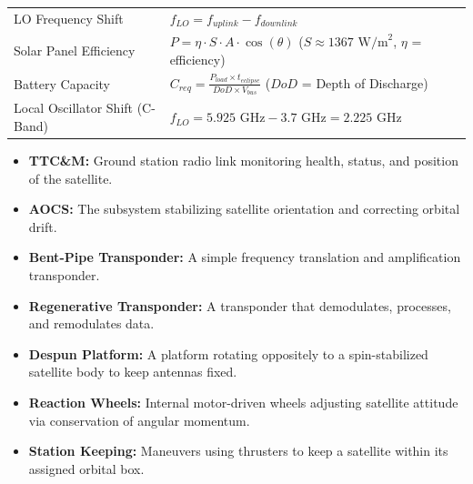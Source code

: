 \documentclass[12pt,a4paper]{article}
\renewcommand{\arraystretch}{1.45}
\begin{document}
\begin{tcolorbox}[formulabox, title={\textbf{Key Formulas at a Glance}}]
\renewcommand{\arraystretch}{1.3}
\begin{tabularx}{\linewidth}{B{5.0cm} X}LO Frequency Shift & $f_{LO} = f_{uplink} - f_{downlink}$ \\[4pt]
Solar Panel Efficiency & $P = \eta \cdot S \cdot A \cdot \cos(\theta)$ \quad ($S \approx 1367 \text{ W/m}^2$, $\eta$ = efficiency) \\[4pt]
Battery Capacity & $C_{req} = \frac{P_{load} \times t_{eclipse}}{DoD \times V_{bus}}$ \quad ($DoD$ = Depth of Discharge) \\[4pt]
Local Oscillator Shift (C-Band) & $f_{LO} = 5.925\text{ GHz} - 3.7\text{ GHz} = 2.225\text{ GHz}$
\end{tabularx}
\end{tcolorbox}

\begin{tcolorbox}[defbox, title={\textbf{One-Line Definitions}}]
\begin{itemize}[leftmargin=*, itemsep=2.5pt, topsep=0pt]
  \item \textbf{TTC\&M:} Ground station radio link monitoring health, status, and position of the satellite.
  \item \textbf{AOCS:} The subsystem stabilizing satellite orientation and correcting orbital drift.
  \item \textbf{Bent-Pipe Transponder:} A simple frequency translation and amplification transponder.
  \item \textbf{Regenerative Transponder:} A transponder that demodulates, processes, and remodulates data.
  \item \textbf{Despun Platform:} A platform rotating oppositely to a spin-stabilized satellite body to keep antennas fixed.
  \item \textbf{Reaction Wheels:} Internal motor-driven wheels adjusting satellite attitude via conservation of angular momentum.
  \item \textbf{Station Keeping:} Maneuvers using thrusters to keep a satellite within its assigned orbital box.
\end{itemize}
\end{tcolorbox}
\end{document}
